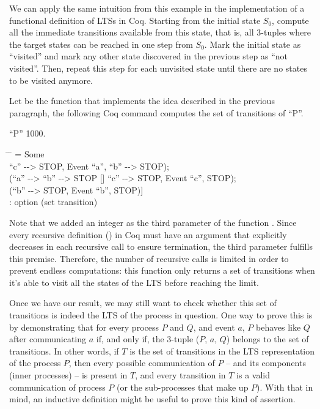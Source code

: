 We can apply the same intuition from this example in the implementation of a functional definition of LTSs in Coq. Starting from the initial state $S_{0}$, compute all the immediate transitions available from this state, that is, all 3-tuples where the target states can be reached in one step from $ S_{0} $. Mark the initial state as ``visited'' and mark any other state discovered in the previous step as ``not visited''. Then, repeat this step for each unvisited state until there are no states to be visited anymore.

Let  be the function that implements the idea described in the previous paragraph, the following Coq command computes the set of transitions of ``P''.

\begin{coqdoccode}
	\coqdocnoindent
	   ``P'' 1000.\coqdoceol
\end{coqdoccode}

\begin{tabbing}
	\hspace*{2.5em}\= \hspace*{2em} \= \kill
	= Some\\
	\>	[(``a'' -{}-> ``b'' -{}-> STOP [] ``c'' -{}-> STOP, Event ``a'', ``b'' -{}-> STOP);\\
	\>	(``a'' -{}-> ``b'' -{}-> STOP [] ``c'' -{}-> STOP, Event ``c'', STOP);\\
	\>	(``b'' -{}-> STOP, Event ``b'', STOP)]\\
	: option (set transition)
\end{tabbing}


Note that we added an integer as the third parameter of the function . Since every recursive definition () in Coq must have an argument that explicitly decreases in each recursive call to ensure termination, the third parameter fulfills this premise. Therefore, the number of recursive calls is limited in order to prevent endless computations: this function only returns a set of transitions when it's able to visit all the states of the LTS before reaching the limit.

Once we have our result, we may still want to check whether this set of transitions is indeed the LTS of the process in question. One way to prove this is by demonstrating that for every process $ P $ and $ Q $, and event $ a $, $ P $ behaves like $ Q $ after communicating $ a $ if, and only if, the 3-tuple ($ P $, $ a $, $ Q $) belongs to the set of transitions. In other words, if $ T $ is the set of transitions in the LTS representation of the process $ P $, then every possible communication of $ P $ -- and its components (inner processes) -- is present in $ T $, and every transition in $ T $ is a valid communication of process $ P $ (or the sub-processes that make up $ P $). With that in mind, an inductive definition might be useful to prove this kind of assertion.

